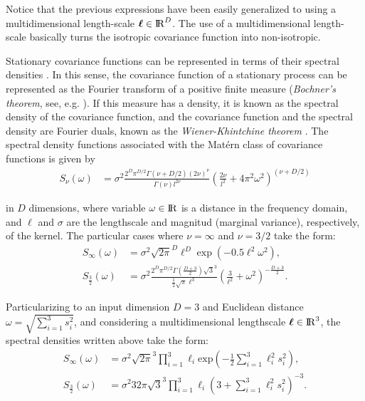 \documentclass[onecolumn,a4paper,11pt]{article}
\begin{document}
\noindent Notice that the previous expressions have been easily generalized to using a multidimensional length-scale $\bm{\ell}\in {\rm I\!R}^D$. The use of a multidimensional length-scale basically turns the isotropic covariance function into non-isotropic. 

Stationary covariance functions can be represented in terms of their spectral densities \citep{rasmussen2006gaussian}. In this sense, the covariance function of a stationary process can be represented as the Fourier transform of a positive finite measure (\textit{Bochner's theorem}, see, e.g. \cite{akhiezer1993theory}). If this measure has a density, it is known as the spectral density of the covariance function, and the covariance function and the spectral density are Fourier duals, known as the \textit{Wiener-Khintchine theorem} \citep{rasmussen2006gaussian}. The spectral density functions associated with the Mat\'ern class of covariance functions is given by
%
\begin{align*}
S_{\nu}(\omega)&= \sigma^2 \frac{2^D\pi^{D/2}\Gamma(\nu+D/2)(2\nu)^{\nu}}{\Gamma(\nu)l^{2\nu}}\left(\frac{2\nu}{l^2}+4\pi^2\omega^2 \right)^{(\nu+D/2)}
\end{align*}

\noindent in $D$ dimensions, where variable $\omega\in {\rm I\!R}$ is a distance in the frequency domain, and $\ell$ and $\sigma$ are the lengthscale and magnitud (marginal variance), respectively, of the kernel. The particular cases where $\nu=\infty$ and $\nu=3/2$ take the form:
%
\begin{align}
S_{\infty}(\omega)&= \sigma^2 \sqrt{2\pi}^D  \ell^D  \exp\left(-0.5 \ell^2 \omega^2\right), \label{eq_specdens_inf}  \\
S_{\frac{3}{2}}(\omega)&= \sigma^2 \frac{2^D\pi^{D/2}\Gamma(\frac{D+3}{2})\sqrt{3}^3}{\frac{1}{2}\sqrt{\pi}\ell^3}\left(\frac{3}{\ell^2}+\omega^2 \right)^{-\frac{D+3}{2}}. \label{eq_specdens_32} 
\end{align}

\noindent Particularizing to an input dimension $D=3$ and Euclidean distance $\omega=\sqrt{\sum_{i=1}^{3}s_i^2}$, and considering a multidimensional lengthscale $\bm{\ell} \in {\rm I\!R}^{3}$, the spectral densities written above take the form:
%
\begin{align*}
S_{\infty}(\omega)&= \sigma^2 \sqrt{2\pi}^{3}  \prod_{i=1}^{3} \ell_i  \mathrm{exp}\left(-\frac{1}{2} \sum_{i=1}^{3} \ell_i^2 s_i^2 \right),   \\
S_{\frac{3}{2}}(\omega)&= \sigma^2 32\pi\sqrt{3}^3\prod_{i=1}^{3}\ell_i\left(3+\sum_{i=1}^{3}\ell_i^2 s_i^2 \right)^{-3}.
\end{align*}
\end{document}

